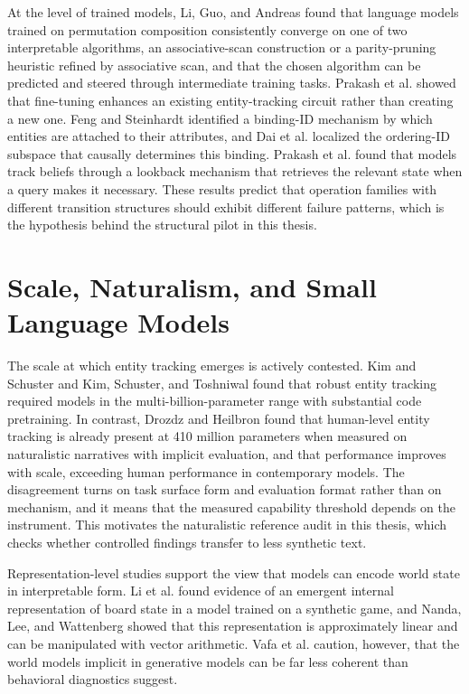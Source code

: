\documentclass{iutbscthesis}
\begin{document}
At the level of trained models, Li, Guo, and Andreas \cite{li2025track} found that language models
trained on permutation composition consistently converge on one of two interpretable algorithms, an
associative-scan construction or a parity-pruning heuristic refined by associative scan, and that the
chosen algorithm can be predicted and steered through intermediate training tasks. Prakash et al.
\cite{prakash2024finetuning} showed that fine-tuning enhances an existing entity-tracking circuit
rather than creating a new one. Feng and Steinhardt \cite{feng2023bind} identified a binding-ID
mechanism by which entities are attached to their attributes, and Dai et al. \cite{dai2024binding}
localized the ordering-ID subspace that causally determines this binding. Prakash et al.
\cite{prakash2025lookbacks} found that models track beliefs through a lookback mechanism that
retrieves the relevant state when a query makes it necessary. These results predict that operation
families with different transition structures should exhibit different failure patterns, which is the
hypothesis behind the structural pilot in this thesis.

\section{Scale, Naturalism, and Small Language Models}
The scale at which entity tracking emerges is actively contested. Kim and Schuster \cite{kim2023entity}
and Kim, Schuster, and Toshniwal \cite{kim2024code} found that robust entity tracking required
models in the multi-billion-parameter range with substantial code pretraining. In contrast, Drozdz and
Heilbron \cite{drozdz2026entity} found that human-level entity tracking is already present at 410
million parameters when measured on naturalistic narratives with implicit evaluation, and that
performance improves with scale, exceeding human performance in contemporary models. The
disagreement turns on task surface form and evaluation format rather than on mechanism, and it
means that the measured capability threshold depends on the instrument. This motivates the
naturalistic reference audit in this thesis, which checks whether controlled findings transfer to less
synthetic text.

Representation-level studies support the view that models can encode world state in interpretable
form. Li et al. \cite{li2022emergent} found evidence of an emergent internal representation of board
state in a model trained on a synthetic game, and Nanda, Lee, and Wattenberg \cite{nanda2023emergent}
showed that this representation is approximately linear and can be manipulated with vector arithmetic.
Vafa et al. \cite{vafa2024worldmodel} caution, however, that the world models implicit in generative
models can be far less coherent than behavioral diagnostics suggest.
\end{document}
